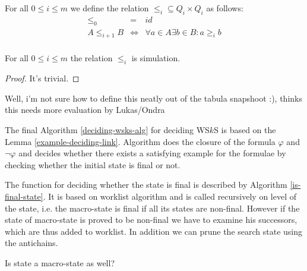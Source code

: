 \begin{defz}
 For all $0 \leq i \leq m$ we define the relation $\leq_i \subseteq Q_i \times
 Q_i$ as follows:
 \begin{eqnarray}
  \leq_0 & = & id\\
  A \leq_{i+1} B & \Leftrightarrow & \forall a \in A \exists b \in B: a \geq_i
  b\\
 \end{eqnarray}
\end{defz}

\begin{lemma}
 For all $0 \leq i \leq m$ the relation $\leq_i$ is simulation.
\end{lemma}
\begin{proof}
 {\color{red} It's trivial.}
\end{proof}

{\color{red} Well, i'm not sure how to define this neatly out of the tabula
snapshoot :), thinks this needs more evaluation by Lukas/Ondra}

The final Algorithm \ref{deciding-wsks-alg} for deciding WS$k$S is based on the Lemma
\ref{example-deciding-link}. Algorithm does the closure of the formula $\varphi$
and $\neg\varphi$ and decides whether there exists a satisfying example for the
formulae by checking whether the initial state is final or not.

The function for deciding whether the state is final is described by Algorithm
\ref{is-final-state}. It is based on worklist algorithm and is called
recursively on level of the state, i.e. the macro-state is final if all its
states are non-final. However if the state of macro-state is proved to be
non-final we have to examine his successors, which are thus added to worklist.
In addition we can prune the search state using the antichains.

{\color{red} Is state a macro-state as well? }

% 

